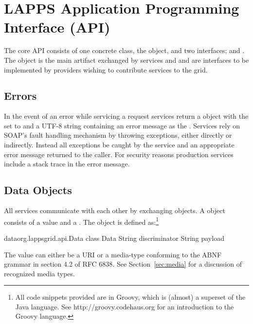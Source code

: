 
\section{LAPPS Application Programming Interface (API)}

The core  \lapps  API consists of one concrete class, the \data  object, and two interfaces; \source and \service.  The \data object is the main artifact exchanged by \lapps services and \source and \service are interfaces to be implemented by providers wishing to contribute services to the \lapps grid.  


\subsection{Errors}

In the event of an error while servicing a request \lapps services \should return a \data object with the \discriminator set to  and a UTF-8 string containing an error message as the \payload. Services \shouldnot rely on SOAP's fault handling mechanism by throwing exceptions, either directly or indirectly. Instead all exceptions \should be caught by the service and an appropriate error message returned to the caller. For security reasons production services \shouldnot include a stack trace in the error message.


\subsection{Data Objects}
All \lapps services communicate with each other by exchanging \data objects.  A \data object consists of a \discriminator value and a \payload.  The \data object is defined as:\footnote{All code snippets provided are in Groovy, which is (almost) a superset of the Java language.  See http://groovy.codehaus.org for an introduction to the Groovy language.}

\begin{groovy}{data}{org.lappsgrid.api.Data}
	class Data {
		String discriminator
		String payload
	}
\end{groovy}

The \discriminator value can either be a URI or a media-type conforming to the ABNF grammar in section 4.2 of RFC 6838\cite{rfc6838}. See Section~\ref{sec:media} for a discussion of recognized \lapps media types.

